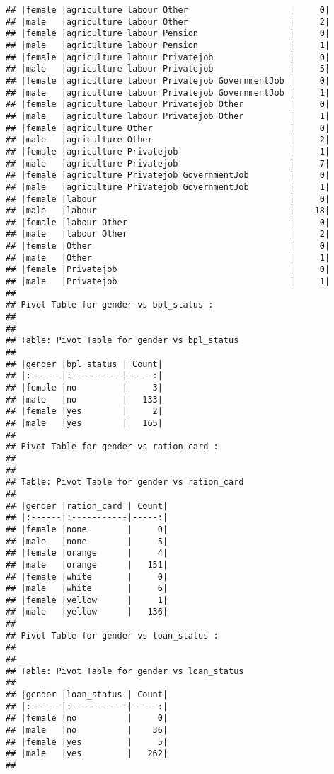 \documentclass[
]{article}
\begin{document}
\begin{verbatim}
## |female |agriculture labour Other                    |     0|
## |male   |agriculture labour Other                    |     2|
## |female |agriculture labour Pension                  |     0|
## |male   |agriculture labour Pension                  |     1|
## |female |agriculture labour Privatejob               |     0|
## |male   |agriculture labour Privatejob               |     5|
## |female |agriculture labour Privatejob GovernmentJob |     0|
## |male   |agriculture labour Privatejob GovernmentJob |     1|
## |female |agriculture labour Privatejob Other         |     0|
## |male   |agriculture labour Privatejob Other         |     1|
## |female |agriculture Other                           |     0|
## |male   |agriculture Other                           |     2|
## |female |agriculture Privatejob                      |     1|
## |male   |agriculture Privatejob                      |     7|
## |female |agriculture Privatejob GovernmentJob        |     0|
## |male   |agriculture Privatejob GovernmentJob        |     1|
## |female |labour                                      |     0|
## |male   |labour                                      |    18|
## |female |labour Other                                |     0|
## |male   |labour Other                                |     2|
## |female |Other                                       |     0|
## |male   |Other                                       |     1|
## |female |Privatejob                                  |     0|
## |male   |Privatejob                                  |     1|
## 
## Pivot Table for gender vs bpl_status :
## 
## 
## Table: Pivot Table for gender vs bpl_status
## 
## |gender |bpl_status | Count|
## |:------|:----------|-----:|
## |female |no         |     3|
## |male   |no         |   133|
## |female |yes        |     2|
## |male   |yes        |   165|
## 
## Pivot Table for gender vs ration_card :
## 
## 
## Table: Pivot Table for gender vs ration_card
## 
## |gender |ration_card | Count|
## |:------|:-----------|-----:|
## |female |none        |     0|
## |male   |none        |     5|
## |female |orange      |     4|
## |male   |orange      |   151|
## |female |white       |     0|
## |male   |white       |     6|
## |female |yellow      |     1|
## |male   |yellow      |   136|
## 
## Pivot Table for gender vs loan_status :
## 
## 
## Table: Pivot Table for gender vs loan_status
## 
## |gender |loan_status | Count|
## |:------|:-----------|-----:|
## |female |no          |     0|
## |male   |no          |    36|
## |female |yes         |     5|
## |male   |yes         |   262|
## 

\end{verbatim}
\end{document}
